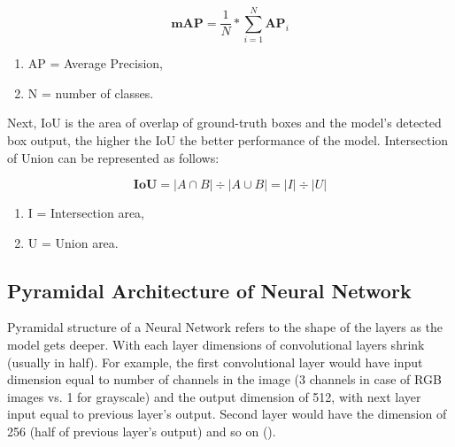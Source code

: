\begin{equation}
	\textbf{mAP} = \frac{1}{N} * \sum_{i = 1}^{N} \textbf{AP}_i
\end{equation}

\begingroup
\fontsize{7pt}{9pt}\selectfont
\begin{enumerate}
	\item[]  \begin{center} AP = Average Precision, \end{center}
	\item[] \begin{center}  N = number of classes. \end{center}
\end{enumerate}
\endgroup


Next, IoU is the area of overlap of ground-truth boxes and the model's detected box output,
the higher the IoU the better performance of the model. Intersection of Union can be 
represented as follows:

\begin{equation}
	\textbf{IoU} = |A \cap B| \div  |A \cup B| = |I| \div |U|
\end{equation}

\begingroup
\fontsize{7pt}{9pt}\selectfont
\begin{enumerate}
	\item[]  \begin{center} I = Intersection area, \end{center}
	\item[] \begin{center}  U = Union area. \end{center}
\end{enumerate}
\endgroup


\subsection{Pyramidal Architecture of Neural Network}


Pyramidal structure of a Neural Network refers to the shape of the layers as the model
gets deeper. With each layer dimensions of convolutional layers shrink (usually in half).
For example, the first convolutional layer would have input dimension equal to number of
channels in the image (3 channels in case of RGB images vs. 1 for grayscale) and the output
dimension of 512, with next layer input equal to previous layer's output. Second layer
would have the dimension of 256 (half of previous layer's output) and so on ().

